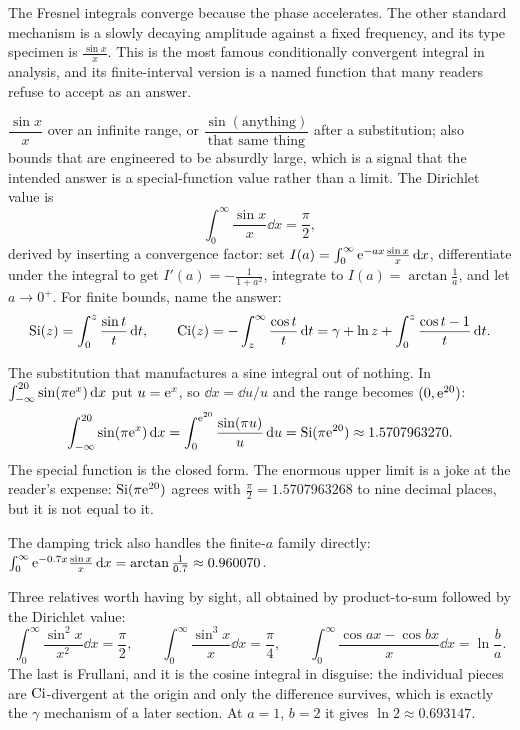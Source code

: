 The Fresnel integrals converge because the phase accelerates. The other standard mechanism is a slowly decaying amplitude against a fixed frequency, and its type specimen is $\frac{\sin x}{x}$. This is the most famous conditionally convergent integral in analysis, and its finite-interval version is a named function that many readers refuse to accept as an answer.

\cue $\dfrac{\sin x}{x}$ over an infinite range, or $\dfrac{\sin(\text{anything})}{\text{that same thing}}$ after a substitution; also bounds that are engineered to be absurdly large, which is a signal that the intended answer is a special-function value rather than a limit.
\method The Dirichlet value is
\[\int_0^{\infty}\frac{\sin x}{x}\dd x=\frac{\pi}{2},\]
derived by inserting a convergence factor: set $I(a)=\int_0^{\infty}\mathrm{e}^{-ax}\frac{\sin x}{x}\,\mathrm{d} x$, differentiate under the integral to get $I'(a)=-\frac{1}{1+a^{2}}$, integrate to $I(a)=\arctan\frac1a$, and let $a\to0^{+}$. For finite bounds, name the answer:
\[\operatorname{Si}(z)=\int_0^{z}\frac{\sin t}{t}\,\mathrm{d} t,\qquad \operatorname{Ci}(z)=-\int_z^{\infty}\frac{\cos t}{t}\,\mathrm{d} t=\gamma+\ln z+\int_0^{z}\frac{\cos t-1}{t}\,\mathrm{d} t.\]

\begin{worked}
The substitution that manufactures a sine integral out of nothing. In $\int_{-\infty}^{20}\sin(\pi\mathrm{e}^{x})\,\mathrm{d} x$ put $u=\mathrm{e}^{x}$, so $\dd x=\dd u/u$ and the range becomes $(0,\mathrm{e}^{20})$:
\[\int_{-\infty}^{20}\sin(\pi\mathrm{e}^{x})\,\mathrm{d} x=\int_0^{\mathrm{e}^{20}}\frac{\sin(\pi u)}{u}\,\mathrm{d} u=\operatorname{Si}(\pi\mathrm{e}^{20})\approx1.5707963270.\]
The special function is the closed form. The enormous upper limit is a joke at the reader's expense: $\operatorname{Si}(\pi\mathrm{e}^{20})$ agrees with $\tfrac{\pi}{2}=1.5707963268$ to nine decimal places, but it is not equal to it.

The damping trick also handles the finite-$a$ family directly: $\int_0^{\infty}\mathrm{e}^{-0.7x}\frac{\sin x}{x}\,\mathrm{d} x=\arctan\frac{1}{0.7}\approx0.960070$.

Three relatives worth having by sight, all obtained by product-to-sum followed by the Dirichlet value:
\[\int_0^{\infty}\frac{\sin^{2}x}{x^{2}}\dd x=\frac{\pi}{2},\qquad
\int_0^{\infty}\frac{\sin^{3}x}{x}\dd x=\frac{\pi}{4},\qquad
\int_0^{\infty}\frac{\cos ax-\cos bx}{x}\dd x=\ln\frac ba.\]
The last is Frullani, and it is the cosine integral in disguise: the individual pieces are $\operatorname{Ci}$-divergent at the origin and only the difference survives, which is exactly the $\gamma$ mechanism of a later section. At $a=1$, $b=2$ it gives $\ln2\approx0.693147$.
\end{worked}


